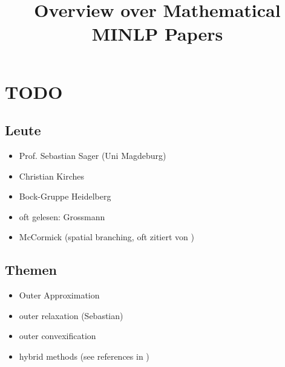 \documentclass{article}
\title{\textbf{Overview over Mathematical MINLP Papers}}
\begin{document}
\maketitle

\section{TODO}
\subsection{Leute}
\begin{itemize}
\item Prof. Sebastian Sager (Uni Magdeburg)
\item Christian Kirches
\item Bock-Gruppe Heidelberg
\item oft gelesen: Grossmann
\item McCormick (spatial branching, oft zitiert von \cite{burer2012non})
\end{itemize}

\subsection{Themen}
\begin{itemize}
\item Outer Approximation
\item outer relaxation (Sebastian)
\item outer convexification
\item hybrid methods (see references in \cite{burer2012non})
\end{itemize}
\end{document}
